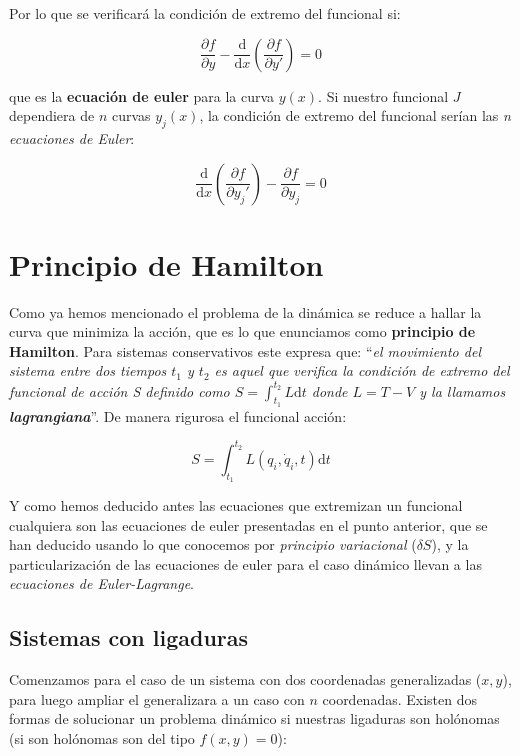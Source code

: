 \documentclass[12pt,a4paper]{book}
\newcommand{\parentesis}[1]{\left( #1  \right)}
\newcommand{\parciales}[2]{\frac{\partial #1}{\partial #2}}
\newcommand{\D}{\mathrm{d}}
\begin{document}
Por lo que se verificará la condición de extremo del funcional si:

\begin{equation}
\parciales{f}{y} - \dfrac{\D}{\D x} \parentesis{\parciales{f}{y'}} = 0
\end{equation}

que es la \textbf{ecuación de euler} para la curva $y(x)$. Si nuestro funcional $J$ dependiera de $n$ curvas $y_j(x)$, la condición de extremo del funcional serían las \textit{n ecuaciones de Euler}:

\begin{equation}
\dfrac{\D}{\D x} \parentesis{\parciales{f}{y_j'}} - \parciales{f}{y_j} = 0
\label{Ec:1.1.012}
\end{equation}

\section{Principio de Hamilton}

Como ya hemos mencionado el problema de la dinámica se reduce a hallar la curva que minimiza la acción, que es lo que enunciamos como \textbf{principio de Hamilton}. Para sistemas conservativos este expresa que: ``\textit{el movimiento del sistema entre dos tiempos $t_1$ y $t_2$ es aquel que verifica la condición de extremo del funcional de acción S definido como $S = \int_{t_1}^{t_2} L \D t $ donde $L=T-V$ y la llamamos \textbf{lagrangiana}}''. De manera rigurosa el funcional acción:

\begin{equation}
S = \int_{t_1}^{t_2} L(q_i,\dot{q}_i,t) \D t
\end{equation}

Y como hemos deducido antes las ecuaciones que extremizan un funcional cualquiera son las ecuaciones de euler presentadas en el punto anterior, que se han deducido usando lo que conocemos por \textit{principio variacional} ($\delta S$), y la particularización de las ecuaciones de euler para el caso dinámico llevan a las \textit{ecuaciones de Euler-Lagrange}. \\

\subsection{Sistemas con ligaduras}

Comenzamos para el caso de un sistema con dos coordenadas generalizadas ($x,y$), para luego ampliar el generalizara a un caso con $n$ coordenadas. Existen dos formas de solucionar un problema dinámico si nuestras ligaduras son holónomas (si son holónomas son del tipo $f(x,y) = 0$):
\end{document}
